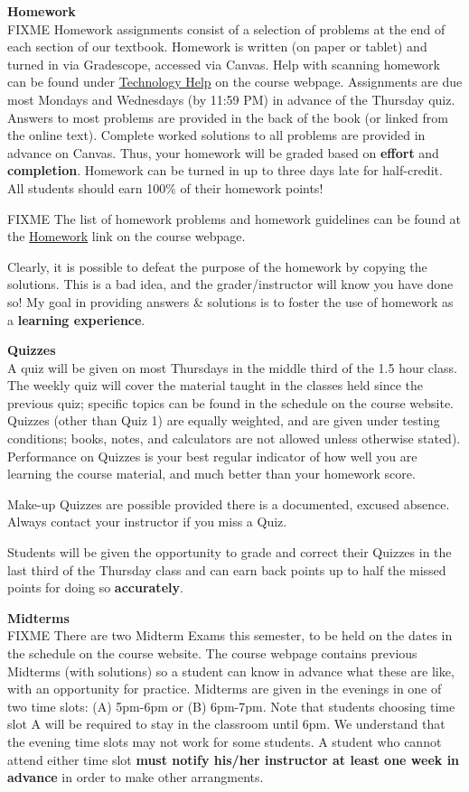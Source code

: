 \documentclass[12pt]{article}
\renewcommand{\emph}[1]{\textsf{\textbf{#1}}}
\newcommand{\localhead}[1]{\par\smallskip\textbf{#1} \smallskip\nobreak\\}%
\def\heading#1{\localhead{\large\emph{#1}}}
\begin{document}
\heading{Homework}
FIXME Homework assignments consist of a selection of problems at the end of each section of our textbook. Homework is written (on paper or tablet) and turned in via Gradescope,  accessed via Canvas.  Help with scanning homework can be found under \href{https://uaf-math251.github.io/techHelp.html}{Technology Help} on the course webpage. Assignments are due most Mondays and Wednesdays (by 11:59 PM) in advance of the Thursday quiz.  Answers to most problems are provided in the back of the book (or linked from the online text). Complete worked solutions to all problems are provided in advance on Canvas. Thus, your homework will be graded based on \emph{effort} and \emph{completion}. Homework can be turned in up to three days late for half-credit. All students should earn 100\% of their homework points!

FIXME The list of homework problems and homework guidelines can be found at the \href{https://bueler.github.io/calc2/writtenhomework.html}{Homework} link on the course webpage.

Clearly, it is possible to defeat the purpose of the homework by copying the solutions. This is a bad idea, and the grader/instructor will know you have done so!  My goal in providing answers \& solutions is to foster the use of homework as a \emph{learning experience}.

\heading{Quizzes}
A quiz will be given on most Thursdays in the middle third of the 1.5 hour class. The weekly quiz will cover the material taught in the classes held since the previous quiz; specific topics can be found in the schedule on
the course website.  Quizzes (other than Quiz 1) are equally weighted, and are given under testing conditions; books, notes, and calculators are not allowed unless otherwise stated). Performance on Quizzes is your best regular indicator of how well you are learning the course material, and much better than your homework score.

Make-up Quizzes are possible provided there is a documented, excused absence. Always contact your instructor if you miss a Quiz.

Students will be given the opportunity to grade and correct their Quizzes in the last third of the Thursday class and can earn back points up to half the missed points for doing so \emph{accurately}.

\heading{Midterms}
FIXME There are two Midterm Exams this semester, to be held on the dates in the schedule on the course website.  The course webpage contains previous Midterms (with solutions) so a student can know in advance what these are like, with an opportunity for practice.  Midterms are given in the evenings in one of two time slots: (A) 5pm-6pm or (B) 6pm-7pm.  Note that students choosing time slot A will be required to stay in the classroom until 6pm.  We understand that the evening time slots may not work for some students.  A student who cannot attend either time slot \emph{must notify his/her instructor at least one week in advance} in order to make other arrangments.
\end{document}
